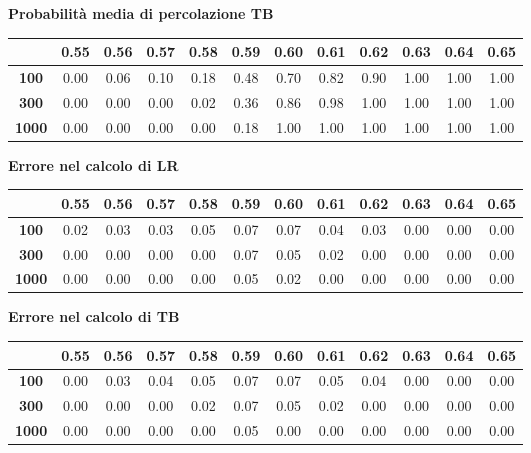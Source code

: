 \noindent
\textbf{Probabilità media di percolazione TB}

\vspace{15px}
\noindent
\begin{tabular}{|c|*{11}{c|}}
	\hline
	\textbf{}&\textbf{0.55} &	\textbf{0.56}& \textbf{0.57} &	\textbf{0.58}	& \textbf{0.59}& 	\textbf{0.60}&	\textbf{0.61}&\textbf{	0.62}&	\textbf{0.63}& \textbf{0.64} &\textbf{0.65}	\\
	\hline
	
	\textbf{100} &0.00 &	0.06 & 0.10	& 0.18	&0.48&	0.70&	0.82& 0.90&	1.00&	1.00&	1.00\\
	\hline
	\textbf{300}& 0.00	&0.00	&0.00	&0.02&	0.36&	0.86&	0.98&	1.00&	1.00	&1.00&	1.00 \\
	\hline
	\textbf{1000}&0.00	&0.00	&0.00	&0.00	&0.18&	1.00	&1.00	&1.00	&1.00&	1.00&	1.00\\
	\hline
\end{tabular}
\vspace{15px}

\noindent
\textbf{Errore nel calcolo di LR}

\vspace{15px}
\noindent
\begin{tabular}{|c|*{11}{c|}}
	\hline
	\textbf{} & \textbf{0.55} & \textbf{0.56} & \textbf{0.57} & \textbf{0.58} & \textbf{0.59} & \textbf{0.60} & \textbf{0.61} & \textbf{0.62} & \textbf{0.63} & \textbf{0.64} & \textbf{0.65} \\
	\hline
	\textbf{100}  & 0.02 & 0.03 & 0.03 & 0.05 & 0.07 & 0.07 & 0.04 & 0.03 & 0.00 & 0.00 & 0.00 \\
	\hline
	\textbf{300}  & 0.00 & 0.00 & 0.00 & 0.00 & 0.07 & 0.05 & 0.02 & 0.00 & 0.00 & 0.00 & 0.00 \\
	\hline
	\textbf{1000} & 0.00 & 0.00 & 0.00 & 0.00 & 0.05 & 0.02 & 0.00 & 0.00 & 0.00 & 0.00 & 0.00 \\
	\hline
\end{tabular}
\vspace{15px}

\noindent
\textbf{Errore nel calcolo di TB}

\vspace{15px}
\noindent
\begin{tabular}{|c|*{11}{c|}}
	\hline
	\textbf{} & \textbf{0.55} & \textbf{0.56} & \textbf{0.57} & \textbf{0.58} & \textbf{0.59} & \textbf{0.60} & \textbf{0.61} & \textbf{0.62} & \textbf{0.63} & \textbf{0.64} & \textbf{0.65} \\
	\hline
	\textbf{100}  & 0.00 & 0.03 & 0.04 & 0.05 & 0.07 & 0.07 & 0.05 & 0.04 & 0.00 & 0.00 & 0.00 \\
	\hline
	\textbf{300}  & 0.00 & 0.00 & 0.00 & 0.02 & 0.07 & 0.05 & 0.02 & 0.00 & 0.00 & 0.00 & 0.00 \\
	\hline
	\textbf{1000} & 0.00 & 0.00 & 0.00 & 0.00 & 0.05 & 0.00 & 0.00 & 0.00 & 0.00 & 0.00 & 0.00 \\
	\hline
\end{tabular}

